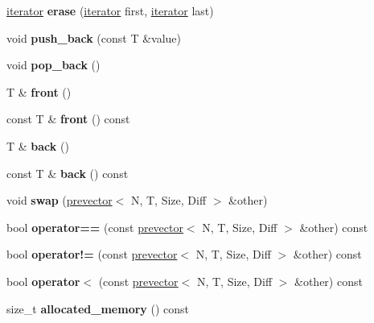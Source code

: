 \begin{DoxyCompactItemize}
\mbox{\hyperlink{classprevector_1_1iterator}{iterator}} {\bfseries erase} (\mbox{\hyperlink{classprevector_1_1iterator}{iterator}} first, \mbox{\hyperlink{classprevector_1_1iterator}{iterator}} last)
\item 
\mbox{\label{classprevector_af34b1eea43f461465aa29fe7ca67449d}} 
void {\bfseries push\+\_\+back} (const T \&value)
\item 
\mbox{\label{classprevector_a14e92ae67d4f110c66fe8c430f44a027}} 
void {\bfseries pop\+\_\+back} ()
\item 
\mbox{\label{classprevector_acb71926f63896b2bd6f4da4ffe515d19}} 
T \& {\bfseries front} ()
\item 
\mbox{\label{classprevector_a6c970d084ff59fcfb81185456acb4bb6}} 
const T \& {\bfseries front} () const
\item 
\mbox{\label{classprevector_a9ff352b7b4f87eb70f0e79547d6f5314}} 
T \& {\bfseries back} ()
\item 
\mbox{\label{classprevector_a5ae4f96ce4f204e135ffd88f2028c128}} 
const T \& {\bfseries back} () const
\item 
\mbox{\label{classprevector_a30e25ab1782f4a6258688334e5d1b817}} 
void {\bfseries swap} (\mbox{\hyperlink{classprevector}{prevector}}$<$ N, T, Size, Diff $>$ \&other)
\item 
\mbox{\label{classprevector_a6de6f6aff0a0ca527754020dbb26f7ab}} 
bool {\bfseries operator==} (const \mbox{\hyperlink{classprevector}{prevector}}$<$ N, T, Size, Diff $>$ \&other) const
\item 
\mbox{\label{classprevector_ab82592ccb4e1434025472492549e0c6d}} 
bool {\bfseries operator!=} (const \mbox{\hyperlink{classprevector}{prevector}}$<$ N, T, Size, Diff $>$ \&other) const
\item 
\mbox{\label{classprevector_aa599ca1a3ab1fef2736b831ffed19d04}} 
bool {\bfseries operator$<$} (const \mbox{\hyperlink{classprevector}{prevector}}$<$ N, T, Size, Diff $>$ \&other) const
\item 
\mbox{\label{classprevector_ad4828b9a087bccd2f7f45dbbcf7cafe7}} 
size\+\_\+t {\bfseries allocated\+\_\+memory} () const
\end{DoxyCompactItemize}


